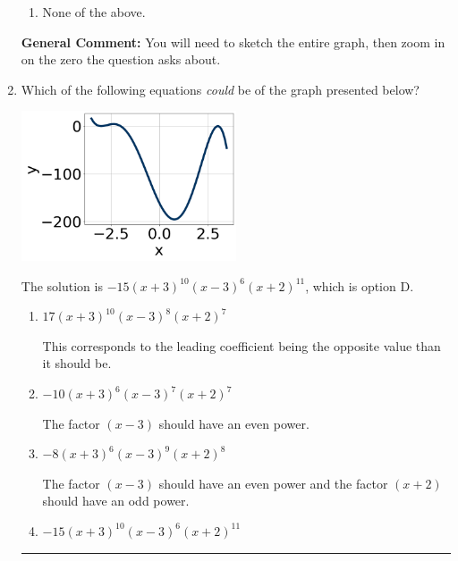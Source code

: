 \documentclass{extbook}[14pt]
\newcommand{\litem}[1]{\item #1

\rule{\textwidth}{0.4pt}}
\begin{document}
\begin{enumerate}
{\begin{enumerate}[label=\Alph*.]
\item None of the above.\end{enumerate}
\textbf{General Comment:} You will need to sketch the entire graph, then zoom in on the zero the question asks about.
}
\litem{
Which of the following equations \textit{could} be of the graph presented below?

\begin{center}
    \includegraphics[width=0.5\textwidth]{../Figures/polyGraphToFunctionB.png}
\end{center}



The solution is \( -15(x + 3)^{10} (x - 3)^{6} (x + 2)^{11} \), which is option D.\begin{enumerate}[label=\Alph*.]
\item \( 17(x + 3)^{10} (x - 3)^{8} (x + 2)^{7} \)

This corresponds to the leading coefficient being the opposite value than it should be.
\item \( -10(x + 3)^{6} (x - 3)^{7} (x + 2)^{7} \)

The factor $(x - 3)$ should have an even power.
\item \( -8(x + 3)^{6} (x - 3)^{9} (x + 2)^{8} \)

The factor $(x - 3)$ should have an even power and the factor $(x + 2)$ should have an odd power.
\item \( -15(x + 3)^{10} (x - 3)^{6} (x + 2)^{11} \)


\end{enumerate}}
\end{enumerate}
\end{document}
